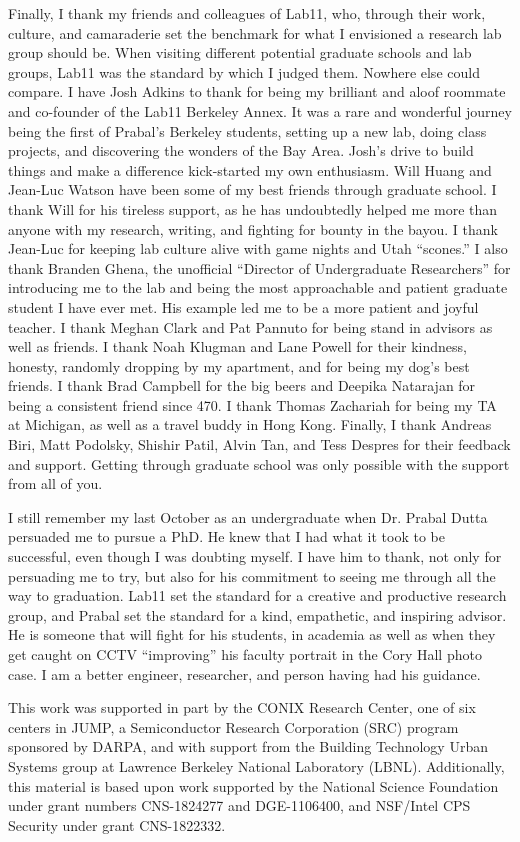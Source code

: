 \begin{acknowledgements}
Finally, I thank my friends and colleagues of Lab11, who, through their work, culture, and camaraderie set the benchmark for what I envisioned a research lab group should be.
When visiting different potential graduate schools and lab groups, Lab11 was the standard by which I judged them. Nowhere else could compare.
I have Josh Adkins to thank for being my brilliant and aloof roommate and co-founder of the Lab11 Berkeley Annex.
It was a rare and wonderful journey being the first of Prabal's Berkeley students, setting up a new lab, doing class projects, and discovering the wonders of the Bay Area. Josh's drive to build things and make a difference kick-started my own enthusiasm.
Will Huang and Jean-Luc Watson have been some of my best friends through graduate school.
I thank Will for his tireless support, as he has undoubtedly helped me more than anyone with my research, writing, and fighting for bounty in the bayou. 
I thank Jean-Luc for keeping lab culture alive with game nights and Utah ``scones.'' 
I also thank Branden Ghena, the unofficial ``Director of Undergraduate Researchers'' for introducing me to the lab and being the most approachable and patient graduate student I have ever met. 
His example led me to be a more patient and joyful teacher. 
I thank Meghan Clark and Pat Pannuto for being stand in advisors as well as friends.
I thank Noah Klugman and Lane Powell for their kindness, honesty, randomly dropping by my apartment, and for being my dog's best friends.
I thank Brad Campbell for the big beers and Deepika Natarajan for being a consistent friend since 470. 
I thank Thomas Zachariah for being my TA at Michigan, as well as a travel buddy in Hong Kong.
Finally, I thank Andreas Biri, Matt Podolsky, Shishir Patil, Alvin Tan, and Tess Despres for their feedback and support.
Getting through graduate school was only possible with the support from all of you.

I still remember my last October as an undergraduate when Dr. Prabal Dutta persuaded me to pursue a PhD.
He knew that I had what it took to be successful, even though I was doubting myself. 
I have him to thank, not only for persuading me to try, but also for his commitment to seeing me through all the way to graduation.
Lab11 set the standard for a creative and productive research group, and Prabal set the standard for a kind, empathetic, and inspiring advisor.
He is someone that will fight for his students, in academia as well as when they get caught on CCTV ``improving'' his faculty portrait in the Cory Hall photo case.
I am a better engineer, researcher, and person having had his guidance.





\vspace*{\fill}
\noindent\small{This work was supported in part by the CONIX Research Center,
one of six centers in JUMP, a Semiconductor Research Corporation
(SRC) program sponsored by DARPA, 
and with support from the
Building Technology Urban Systems group at Lawrence Berkeley
National Laboratory (LBNL). 
Additionally, this material is
based upon work supported by the National Science Foundation
under grant numbers CNS-1824277 and DGE-1106400, and NSF/Intel CPS Security under grant CNS-1822332.
}
\end{acknowledgements}